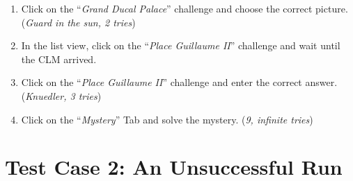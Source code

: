 \begin{enumerate}
	\item Click on the ``\emph{Grand Ducal Palace}'' challenge and choose the correct picture. (\emph{Guard in the sun, 2 tries})
	\item In the list view, click on the ``\emph{Place Guillaume II}'' challenge and wait until the CLM arrived.
	\item Click on the ``\emph{Place Guillaume II}'' challenge and enter the correct answer. (\emph{Knuedler, 3 tries})
	\item Click on the ``\emph{Mystery}'' Tab and solve the mystery. (\emph{9, infinite tries})
\end{enumerate}

\section{Test Case 2: An Unsuccessful Run}
